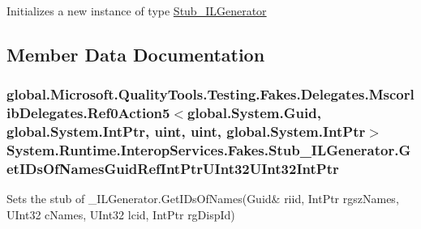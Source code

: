 Initializes a new instance of type \hyperlink{class_system_1_1_runtime_1_1_interop_services_1_1_fakes_1_1_stub___i_l_generator}{Stub\-\_\-\-I\-L\-Generator}



\subsection{Member Data Documentation}
\hypertarget{class_system_1_1_runtime_1_1_interop_services_1_1_fakes_1_1_stub___i_l_generator_a2e247533b0a7269be964d166da9e3778}{
\subsubsection[{Get\-I\-Ds\-Of\-Names\-Guid\-Ref\-Int\-Ptr\-U\-Int32\-U\-Int32\-Int\-Ptr}]{\setlength{\rightskip}{0pt plus 5cm}global.\-Microsoft.\-Quality\-Tools.\-Testing.\-Fakes.\-Delegates.\-Mscorlib\-Delegates.\-Ref0\-Action5$<$global.\-System.\-Guid, global.\-System.\-Int\-Ptr, uint, uint, global.\-System.\-Int\-Ptr$>$ System.\-Runtime.\-Interop\-Services.\-Fakes.\-Stub\-\_\-\-I\-L\-Generator.\-Get\-I\-Ds\-Of\-Names\-Guid\-Ref\-Int\-Ptr\-U\-Int32\-U\-Int32\-Int\-Ptr}}\label{class_system_1_1_runtime_1_1_interop_services_1_1_fakes_1_1_stub___i_l_generator_a2e247533b0a7269be964d166da9e3778}


Sets the stub of \-\_\-\-I\-L\-Generator.\-Get\-I\-Ds\-Of\-Names(Guid\& riid, Int\-Ptr rgsz\-Names, U\-Int32 c\-Names, U\-Int32 lcid, Int\-Ptr rg\-Disp\-Id)

